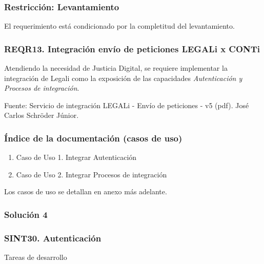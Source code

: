 \documentclass[
  paper=a4,
  ,captions=tableheading
]{scrartcl}
\providecommand{\tightlist}{%
  \setlength{\itemsep}{0pt}\setlength{\parskip}{0pt}}
\begin{document}
\subsubsection{Restricción:
Levantamiento}\label{sec:restricciuxf3n-levantamiento}

El requerimiento está condicionado por la completitud del levantamiento.

\subsubsection{REQR13. Integración envío de peticiones LEGALi x
CONTi}\label{sec:reqr13.-integraciuxf3n-envuxedo-de-peticiones-legali-x-conti}

Atendiendo la necesidad de Justicia Digital, se requiere implementar la
integración de Legali como la exposición de las capacidades
\emph{Autenticación y Procesos de integración}.

Fuente: Servicio de integración LEGALi - Envío de peticiones - v5 (pdf).
José Carlos Schröder Júnior.

\subsubsection{Índice de la documentación (casos de
uso)}\label{sec:uxedndice-de-la-documentaciuxf3n-casos-de-uso}

\begin{enumerate}
\def\labelenumi{\arabic{enumi}.}
\tightlist
\item
  Caso de Uso 1. Integrar Autenticación
\item
  Caso de Uso 2. Integrar Procesos de integración
\end{enumerate}

Los casos de uso se detallan en anexo más adelante.

\subsubsection{Solución 4}\label{sec:soluciuxf3n-4}

\subsubsection{SINT30.
Autenticación}\label{sec:sint30.-autenticaciuxf3n}

Tareas de desarrollo
\end{document}
